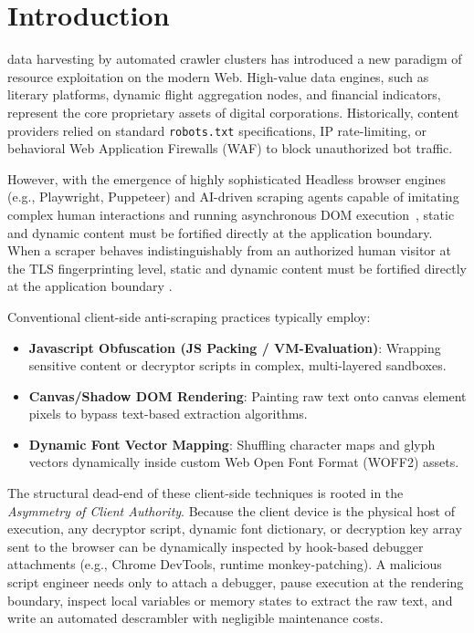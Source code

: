 \documentclass[10pt,journal,compsoc]{IEEEtran}
\begin{document}
\IEEEdisplaynontitleabstractindextext
\IEEEpeerreviewmaketitle

\section{Introduction}
 data harvesting by automated crawler clusters has introduced a new paradigm of resource exploitation on the modern Web. High-value data engines, such as literary platforms, dynamic flight aggregation nodes, and financial indicators, represent the core proprietary assets of digital corporations. Historically, content providers relied on standard \texttt{robots.txt} specifications, IP rate-limiting, or behavioral Web Application Firewalls (WAF) to block unauthorized bot traffic. 

However, with the emergence of highly sophisticated Headless browser engines (e.g., Playwright, Puppeteer) and AI-driven scraping agents capable of imitating complex human interactions and running asynchronous DOM execution~\cite{owasp}, static and dynamic content must be fortified directly at the application boundary. When a scraper behaves indistinguishably from an authorized human visitor at the TLS fingerprinting level, static and dynamic content must be fortified directly at the application boundary \cite{whatwg}.

Conventional client-side anti-scraping practices typically employ:
\begin{itemize}
    \item \textbf{Javascript Obfuscation (JS Packing / VM-Evaluation)}: Wrapping sensitive content or decryptor scripts in complex, multi-layered sandboxes.
    \item \textbf{Canvas/Shadow DOM Rendering}: Painting raw text onto canvas element pixels to bypass text-based extraction algorithms.
    \item \textbf{Dynamic Font Vector Mapping}: Shuffling character maps and glyph vectors dynamically inside custom Web Open Font Format (WOFF2) assets.
\end{itemize}

The structural dead-end of these client-side techniques is rooted in the \emph{Asymmetry of Client Authority}. Because the client device is the physical host of execution, any decryptor script, dynamic font dictionary, or decryption key array sent to the browser can be dynamically inspected by hook-based debugger attachments (e.g., Chrome DevTools, runtime monkey-patching). A malicious script engineer needs only to attach a debugger, pause execution at the rendering boundary, inspect local variables or memory states to extract the raw text, and write an automated descrambler with negligible maintenance costs.
\end{document}
